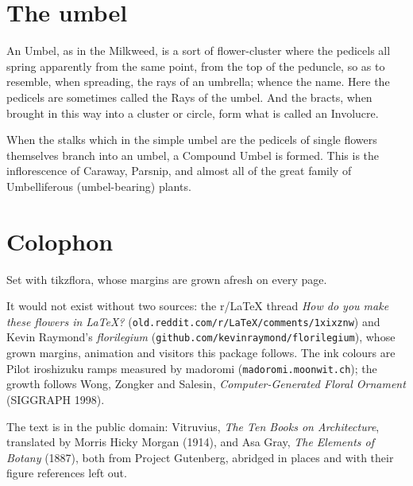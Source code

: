 \documentclass[11pt,twoside]{article}
\begin{document}
\vspace{4.5cm}

\section{The umbel}

An Umbel, as in the Milkweed, is a sort of flower-cluster where the
pedicels all spring apparently from the same point, from the top of the
peduncle, so as to resemble, when spreading, the rays of an umbrella;
whence the name. Here the pedicels are sometimes called the Rays of the
umbel. And the bracts, when brought in this way into a cluster or circle,
form what is called an Involucre.

When the stalks which in the simple umbel are the pedicels of single
flowers themselves branch into an umbel, a Compound Umbel is formed. This
is the inflorescence of Caraway, Parsnip, and almost all of the great family
of Umbelliferous (umbel-bearing) plants.
\clearpage
\restoregeometry

\section{Colophon}
\raggedright
Set with \textsf{tikzflora}, whose margins are grown afresh on every page.

It would not exist without two sources: the r/LaTeX thread
\emph{How do you make these flowers in LaTeX?}
(\texttt{old.reddit.com/r/LaTeX/comments/1xixznw}) and Kevin Raymond's
\emph{florilegium} (\texttt{github.com/kevinraymond/florilegium}), whose grown
margins, animation and visitors this package follows. The ink colours are
Pilot iroshizuku ramps measured by madoromi
(\texttt{madoromi.moonwit.ch}); the growth follows Wong, Zongker and Salesin,
\emph{Computer-Generated Floral Ornament} (SIGGRAPH 1998).

The text is in the public domain: Vitruvius, \emph{The Ten Books on
Architecture}, translated by Morris Hicky Morgan (1914), and Asa Gray,
\emph{The Elements of Botany} (1887), both from Project Gutenberg,
abridged in places and with their figure references left out.
\end{document}
